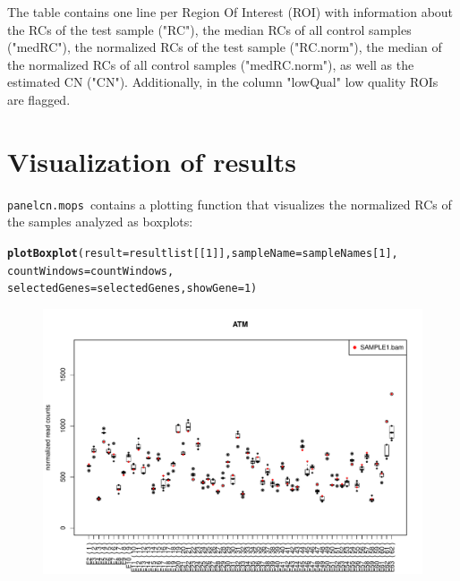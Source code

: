 \documentclass[article]{bioinf}\usepackage[]{graphicx}\usepackage[]{color}
\makeatletter
\newcommand{\hlnum}[1]{\textcolor[rgb]{0.686,0.059,0.569}{#1}}%
\newcommand{\hlstd}[1]{\textcolor[rgb]{0.345,0.345,0.345}{#1}}%
\newcommand{\hlkwc}[1]{\textcolor[rgb]{0.333,0.667,0.333}{#1}}%
\newcommand{\hlkwd}[1]{\textcolor[rgb]{0.737,0.353,0.396}{\textbf{#1}}}%
\newenvironment{kframe}{%
 \def\at@end@of@kframe{}%
 \ifinner\ifhmode%
  \def\at@end@of@kframe{\end{minipage}}%
  \begin{minipage}{\columnwidth}%
 \fi\fi%
 \def\FrameCommand##1{\hskip\@totalleftmargin \hskip-\fboxsep
 \colorbox{shadecolor}{##1}\hskip-\fboxsep
     \hskip-\linewidth \hskip-\@totalleftmargin \hskip\columnwidth}%
 \MakeFramed {\advance\hsize-\width
   \@totalleftmargin\z@ \linewidth\hsize
   \@setminipage}}%
 {\par\unskip\endMakeFramed%
 \at@end@of@kframe}
\newenvironment{knitrout}{}{} %
\newcommand{\panelcnmops}{\texttt{panelcn.mops}}
\makeatother
\begin{document}
The table contains one line per Region Of Interest (ROI) with information about 
the RCs of the test sample ("RC"), 
the median RCs of all control samples ("medRC"), 
the normalized RCs of the test sample ("RC.norm"), 
the median of the normalized RCs of all control samples ("medRC.norm"), 
as well as the estimated CN ("CN"). 
Additionally, in the column "lowQual" low quality ROIs are flagged.



\section{Visualization of results}
\label{s:plot}
\panelcnmops\ contains a plotting function that visualizes the normalized RCs 
of the samples analyzed as boxplots:

\begin{center}
\begin{knitrout}
\color{fgcolor}\begin{kframe}
\begin{alltt}
\hlkwd{plotBoxplot}\hlstd{(}\hlkwc{result} \hlstd{= resultlist[[}\hlnum{1}\hlstd{]],} \hlkwc{sampleName} \hlstd{= sampleNames[}\hlnum{1}\hlstd{],}
            \hlkwc{countWindows} \hlstd{= countWindows,}
            \hlkwc{selectedGenes} \hlstd{= selectedGenes,} \hlkwc{showGene} \hlstd{=} \hlnum{1}\hlstd{)}
\end{alltt}
\end{kframe}
\end{knitrout}


\begin{figure}[H]
\begin{center}
\includegraphics[angle=0,width= 0.9\columnwidth]{001.pdf}
\end{center}
\end{figure}
\end{center}
\end{document}
